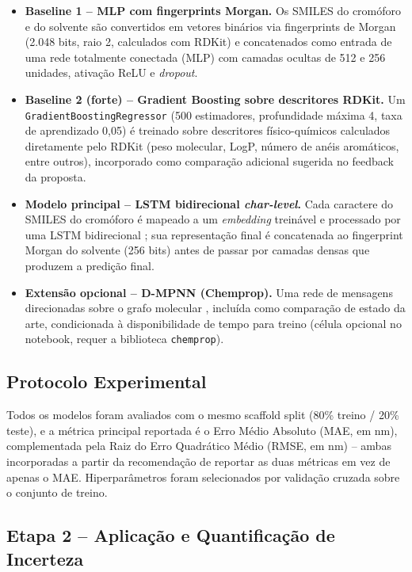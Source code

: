 \documentclass[12pt]{article}
\begin{document}
\begin{itemize}
  \item \textbf{Baseline 1 -- MLP com fingerprints Morgan.} Os SMILES do cromóforo e do
  solvente são convertidos em vetores binários via fingerprints de Morgan
  \cite{rogers2010} (2.048 bits, raio 2, calculados com RDKit) e concatenados como entrada
  de uma rede totalmente conectada (MLP) com camadas ocultas de 512 e 256 unidades,
  ativação ReLU e \emph{dropout}.

  \item \textbf{Baseline 2 (forte) -- Gradient Boosting sobre descritores RDKit.} Um
  \texttt{GradientBoostingRegressor} \cite{friedman2001} (500 estimadores, profundidade
  máxima 4, taxa de aprendizado 0,05) é treinado sobre descritores físico-químicos
  calculados diretamente pelo RDKit (peso molecular, LogP, número de anéis aromáticos,
  entre outros), incorporado como comparação adicional sugerida no feedback da proposta.

  \item \textbf{Modelo principal -- LSTM bidirecional \emph{char-level}.} Cada caractere
  do SMILES do cromóforo é mapeado a um \emph{embedding} treinável e processado por uma
  LSTM bidirecional \cite{schuster1997}; sua representação final é concatenada ao
  fingerprint Morgan do solvente (256 bits) antes de passar por camadas densas que
  produzem a predição final.

  \item \textbf{Extensão opcional -- D-MPNN (Chemprop).} Uma rede de mensagens direcionadas
  sobre o grafo molecular \cite{yang2019}, incluída como comparação de estado da arte,
  condicionada à disponibilidade de tempo para treino (célula opcional no notebook,
  requer a biblioteca \texttt{chemprop}).
\end{itemize}

\subsection{Protocolo Experimental}

Todos os modelos foram avaliados com o mesmo scaffold split (80\% treino / 20\% teste), e
a métrica principal reportada é o Erro Médio Absoluto (MAE, em nm), complementada pela
Raiz do Erro Quadrático Médio (RMSE, em nm) -- ambas incorporadas a partir da recomendação
de reportar as duas métricas em vez de apenas o MAE. Hiperparâmetros foram selecionados
por validação cruzada sobre o conjunto de treino.

\subsection{Etapa 2 -- Aplicação e Quantificação de Incerteza}
\end{document}

